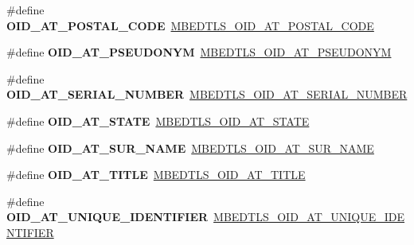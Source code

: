 \begin{DoxyCompactItemize}
\item 
\mbox{\label{compat-1_83_8h_a67f42ab3f87ccccaa50bd906a2654583}} 
\#define {\bfseries O\+I\+D\+\_\+\+A\+T\+\_\+\+P\+O\+S\+T\+A\+L\+\_\+\+C\+O\+DE}~\mbox{\hyperlink{oid_8h_a69242d2fda38d1cefe38738e660bfc35}{M\+B\+E\+D\+T\+L\+S\+\_\+\+O\+I\+D\+\_\+\+A\+T\+\_\+\+P\+O\+S\+T\+A\+L\+\_\+\+C\+O\+DE}}
\item 
\mbox{\label{compat-1_83_8h_a300a121414abf83995d18219ff70682f}} 
\#define {\bfseries O\+I\+D\+\_\+\+A\+T\+\_\+\+P\+S\+E\+U\+D\+O\+N\+YM}~\mbox{\hyperlink{oid_8h_aab2fb77f1c86a04cd4c0be2e7f7f7775}{M\+B\+E\+D\+T\+L\+S\+\_\+\+O\+I\+D\+\_\+\+A\+T\+\_\+\+P\+S\+E\+U\+D\+O\+N\+YM}}
\item 
\mbox{\label{compat-1_83_8h_a0492b474aa8361e1f82e2e9028042b3c}} 
\#define {\bfseries O\+I\+D\+\_\+\+A\+T\+\_\+\+S\+E\+R\+I\+A\+L\+\_\+\+N\+U\+M\+B\+ER}~\mbox{\hyperlink{oid_8h_a288608f190ebeeeb0287c026ffa45578}{M\+B\+E\+D\+T\+L\+S\+\_\+\+O\+I\+D\+\_\+\+A\+T\+\_\+\+S\+E\+R\+I\+A\+L\+\_\+\+N\+U\+M\+B\+ER}}
\item 
\mbox{\label{compat-1_83_8h_a6d9e7accacbfd7506680251e0c02fc14}} 
\#define {\bfseries O\+I\+D\+\_\+\+A\+T\+\_\+\+S\+T\+A\+TE}~\mbox{\hyperlink{oid_8h_a84965b3da3240d7189d78cb00d92a569}{M\+B\+E\+D\+T\+L\+S\+\_\+\+O\+I\+D\+\_\+\+A\+T\+\_\+\+S\+T\+A\+TE}}
\item 
\mbox{\label{compat-1_83_8h_a0b6a014152c7db9e089d737f741675f7}} 
\#define {\bfseries O\+I\+D\+\_\+\+A\+T\+\_\+\+S\+U\+R\+\_\+\+N\+A\+ME}~\mbox{\hyperlink{oid_8h_a7d0c477fb4c5c11f34e125792289f928}{M\+B\+E\+D\+T\+L\+S\+\_\+\+O\+I\+D\+\_\+\+A\+T\+\_\+\+S\+U\+R\+\_\+\+N\+A\+ME}}
\item 
\mbox{\label{compat-1_83_8h_a41e8aab7109783adf5d2168ad3c6e5b4}} 
\#define {\bfseries O\+I\+D\+\_\+\+A\+T\+\_\+\+T\+I\+T\+LE}~\mbox{\hyperlink{oid_8h_a9b12474db750af2e508618ce69971de2}{M\+B\+E\+D\+T\+L\+S\+\_\+\+O\+I\+D\+\_\+\+A\+T\+\_\+\+T\+I\+T\+LE}}
\item 
\mbox{\label{compat-1_83_8h_a396e2ae0009b1910fa8d381944db7095}} 
\#define {\bfseries O\+I\+D\+\_\+\+A\+T\+\_\+\+U\+N\+I\+Q\+U\+E\+\_\+\+I\+D\+E\+N\+T\+I\+F\+I\+ER}~\mbox{\hyperlink{oid_8h_a2d5765d4afcc9c3b6a6c24d797ba8f96}{M\+B\+E\+D\+T\+L\+S\+\_\+\+O\+I\+D\+\_\+\+A\+T\+\_\+\+U\+N\+I\+Q\+U\+E\+\_\+\+I\+D\+E\+N\+T\+I\+F\+I\+ER}}

\end{DoxyCompactItemize}
